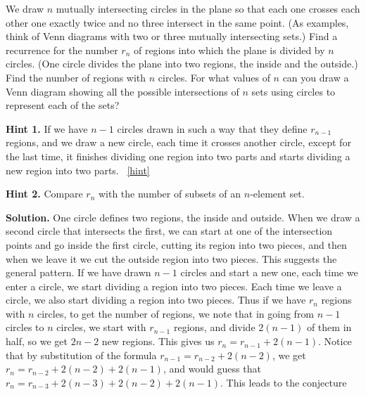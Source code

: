 \documentclass{book}
\begin{document}
\setcounter{project}{138}
\addtocounter{project}{-1}
\begin{activity}[]\label{circlesinplane}
\hypertarget{p-929}{}%
We draw \(n\) mutually intersecting circles in the plane so that each one crosses each other one exactly twice and no three intersect in the same point. (As examples, think of Venn diagrams with two or three mutually intersecting sets.) Find a recurrence for the number \(r_n\) of regions into which the plane is divided by \(n\) circles. (One circle divides the plane into two regions, the inside and the outside.) Find the number of regions with \(n\) circles. For what values of \(n\) can you draw a Venn diagram showing all the possible intersections of \(n\) sets using circles to represent each of the sets?%
\par\smallskip%
\noindent\textbf{Hint 1.}\hypertarget{hint-96}{}\quad%
\hypertarget{p-930}{}%
If we have \(n - 1\) circles drawn in such a way that they define \(r_{n-1}\) regions, and we draw a new circle, each time it crosses another circle, except for the last time, it finishes dividing one region into two parts and starts dividing a new region into two parts.%
~\hfill{\tiny\hyperlink{a-138}{[hint]}\hypertarget{q-138}{}}\par\smallskip%
\noindent\textbf{Hint 2.}\hypertarget{hint-97}{}\quad%
\hypertarget{p-931}{}%
Compare \(r_n\) with the number of subsets of an \(n\)-element set.%
\par\smallskip%
\noindent\textbf{Solution.}\hypertarget{solution-91}{}\quad%
\hypertarget{p-932}{}%
One circle defines two regions, the inside and outside. When we draw a second circle that intersects the first, we can start at one of the intersection points and go inside the first circle, cutting its region into two pieces, and then when we leave it we cut the outside region into two pieces. This suggests the general pattern. If we have drawn \(n-1\) circles and start a new one, each time we enter a circle, we start dividing a region into two pieces. Each time we leave a circle, we also start dividing a region into two pieces. Thus if we have \(r_n\) regions with \(n\) circles, to get the number of regions, we note that in going from \(n-1\) circles to \(n\) circles, we start with \(r_{n-1}\) regions, and divide \(2(n-1)\) of them in half, so we get \(2n-2\) new regions. This gives us \(r_n=r_{n-1}+2(n-1)\). Notice that by substitution of the formula \(r_{n-1}=r_{n-2} +2(n-2)\), we get \(r_n=r_{n-2}+ 2(n-2) +2(n-1)\), and would guess that \(r_n=r_{n-3}+2(n-3)+2(n-2) +2(n-1)\). This leads to the conjecture%

\end{activity}
\end{document}
